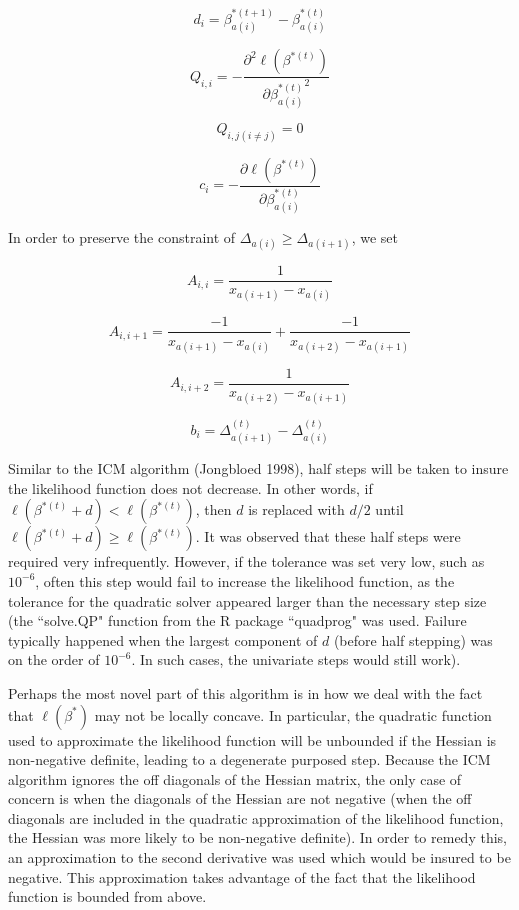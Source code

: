 \documentclass[10pt]{article}
\begin{document}
	\[ d_i = \beta^{*(t+1)}_{a(i)} - \beta^{*(t)}_{a(i)}
	\]
	
	\[Q_{i,i} = - \frac{\partial^2 \ell(\beta^{*(t)} )} {\partial {\beta^{*(t)}_{a(i)}}^2}
	\]
	 
	 \[
	 Q_{i,j (i\neq j)} = 0
	 \]
	 
	\[c_i = -\frac{\partial \ell(\beta^{*(t)})} {\partial \beta_{a(i)}^{*(t)} }
	\]
	
	In order to preserve the constraint of $\Delta_{a(i)} \geq \Delta_{a(i+1)}$, we set 
	
	\[ A_{i,i} = \frac{1}{x_{a(i+1)} - x_{a(i)} }
	\]
	
	\[ A_{i, i + 1} = \frac{-1}{x_{a(i+1)} - x_{a(i)} } + \frac{-1}{x_{a(i+2)} - x_{a(i + 1)} }
	\]
	
	\[ A_{i, i + 2} = \frac{1}{x_{a(i+2)} - x_{a(i + 1)} }
	\]
	
	\[ b_i =\Delta_{a(i + 1)}^{(t)} - \Delta_{a(i)}^{(t)}
	\]
	
	Similar to the ICM algorithm (Jongbloed 1998), half steps will be taken to insure the likelihood function does not decrease. In other words, if $\ell ( \beta^{*(t)} + d ) < \ell ( \beta^{*(t)}  ) $, then $d$ is replaced with $d/2$ until $\ell ( \beta^{*(t)} + d ) \geq \ell ( \beta^{*(t)} )$. It was observed that these half steps were required very infrequently. However, if the tolerance was set very low, such as $10^{-6}$, often this step would fail to increase the likelihood function, as the tolerance for the quadratic solver appeared larger than the necessary step size (the ``solve.QP" function from the R package ``quadprog" was used. Failure typically happened when the largest component of $d$ (before half stepping) was on the order of $10^{-6}$. In such cases, the univariate steps would still work). 
	
	Perhaps the most novel part of this algorithm is in how we deal with the fact that $\ell(\beta^*)$ may not be locally concave. In particular, the quadratic function used to approximate the likelihood function will be unbounded if the Hessian is non-negative definite, leading to a degenerate purposed step. Because the ICM algorithm ignores the off diagonals of the Hessian matrix, the only case of concern is when the diagonals of the Hessian are not negative (when the off diagonals are included in the quadratic approximation of the likelihood function, the Hessian was more likely to be non-negative definite). In order to remedy this, an approximation to the second derivative was used which would be insured to be negative. This approximation takes advantage of the fact that the likelihood function is bounded from above. 
		
\end{document}
